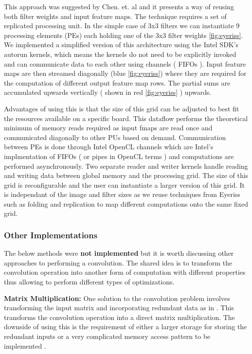 This approach was suggested by Chen. et. al \cite{eyeriss} and it presents a way of reusing both filter weights and input feature maps. The technique requires a set of replicated processing unit. In the simple case of 3x3 filters we can instantiate 9 processing elements (PEs) each holding one of the 3x3 filter weights \ref{fig:eyeriss}. We implemented a simplified version of this architecture using the Intel SDK’s autorun kernels, which means the kernels do not need to be explicitly invoked and can communicate data to each other using channels ( FIFOs ). Input feature maps are then streamed diagonally (blue \ref{fig:eyeriss}) where they are required for the computation of different output feature map rows. The partial sums are accumulated upwards vertically ( shown in red \ref{fig:eyeriss} ) upwards. 

Advantages of using this is that the size of this grid can be adjusted to best fit the resources available on a specific board. This dataflow performs the theoretical minimum of memory reads required as input fmaps are read once and communicated diagonally to other PUs based on demand. Communication between PEs is done through Intel OpenCL channels which are Intel’s implmentation of FIFOs ( or pipes in OpenCL terms ) and computations are performed asynchronously. Two separate reader and writer kernels handle reading and writing data between global memory and the processing grid. The size of this grid is reconfigurable and the user can instantiate a larger version of this grid. It is independant of the image and filter sizes as we reuse techniques from Eyeriss \cite{eyeriss} such as folding and replication to map different computations onto the same fixed grid.


\subsubsection{Other Implementations}

The below methods were \textbf{not implemented} but it is worth discussing other approaches to performing a convolution. The shared idea is to transform the convolution operation into another form of computation with different properties thus allowing to perform different types of optimizations. 

\textbf{Matrix Multiplication:} One solution to the convolution problem involves transforming the input matrix and incorporating redundant data as in \cite{cudnn}. This transforms the convolution operation into a direct matrix multiplication. The downside of using this is the requirement of either a larger storage for storing the redundant inputs or a very complicated memory access pattern to be implemented \cite{ddl}.

